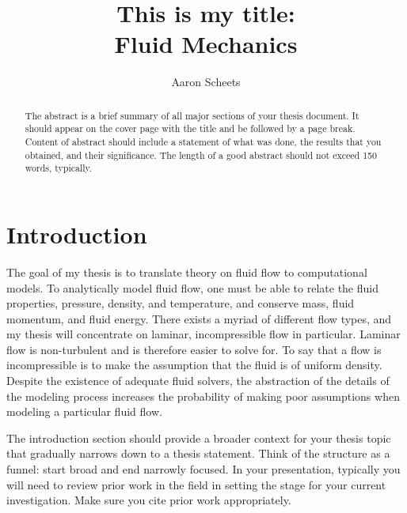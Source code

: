 \documentclass[twocolumn,12pt]{article}
\title{This is my title:  \\
Fluid Mechanics}
\author{Aaron Scheets
}
\begin{document}
\maketitle

\def\bd{\begin{displaymath}}
\def\be{\begin{equation}}
\def\ed{\end{displaymath}}
\def\ee{\end{equation}}

\doublespacing

\begin{abstract} 
\noindent The abstract is a brief summary of all major sections of your thesis document.   It should appear on the cover page with the title and be followed by a page break.  Content of abstract should include a statement of what was done, the results that you obtained, and their significance.   The length of a good abstract should not exceed 150 words, typically.
\end{abstract}

\clearpage


\section{Introduction}

The goal of my thesis is to translate theory on fluid flow to computational models. To analytically model fluid flow, one must be able to relate the fluid properties, pressure, density, and temperature, and conserve mass, fluid momentum, and fluid energy. There exists a myriad of different flow types, and my thesis will concentrate on laminar, incompressible flow in particular. Laminar flow is non-turbulent and is therefore easier to solve for. To say that a flow is incompressible is to make the assumption that the fluid is of uniform density. Despite the existence of adequate fluid solvers, the abstraction of the details of the modeling process increases the probability of making poor assumptions when modeling a particular fluid flow.  

The introduction section should provide a broader context for your thesis topic that gradually narrows down to a thesis statement.  Think of the structure as a funnel:  start broad and end narrowly focused.  In your presentation, typically you will need to review prior work in the field in setting the stage for your current investigation.  Make sure you cite prior work appropriately.\cite{a-ref}
\end{document}
